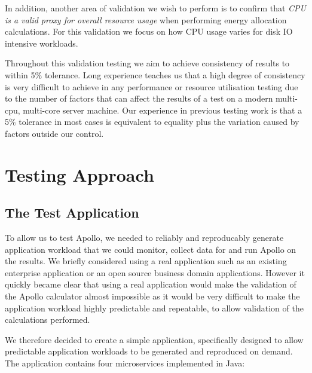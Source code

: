 In addition, another area of validation we wish to perform is to confirm that \emph{CPU is a valid proxy for overall resource usage} when performing energy allocation calculations.  For this validation we focus on how CPU usage varies for disk IO intensive workloads.

Throughout this validation testing we aim to achieve consistency of results to within 5\% tolerance.  Long experience teaches us that a high degree of consistency is very difficult to achieve in any performance or resource utilisation testing due to the number of factors that can affect the results of a test on a modern multi-cpu, multi-core server machine.  Our experience in previous testing work is that a 5\% tolerance in most cases is equivalent to equality plus the variation caused by factors outside our control.

\section{Testing Approach}

\subsection{The Test Application}

To allow us to test Apollo, we needed to reliably and reproducably generate application workload that we could monitor, collect data for and run Apollo on the results.  We briefly considered using a real application such as an existing enterprise application or an open source business domain applications.  However it quickly became clear that using a real application would make the validation of the Apollo calculator almost impossible as it would be very difficult to make the application workload highly predictable and repeatable, to allow validation of the calculations performed.

We therefore decided to create a simple application, specifically designed to allow predictable application workloads to be generated and reproduced on demand.  The application contains four microservices implemented in Java:

